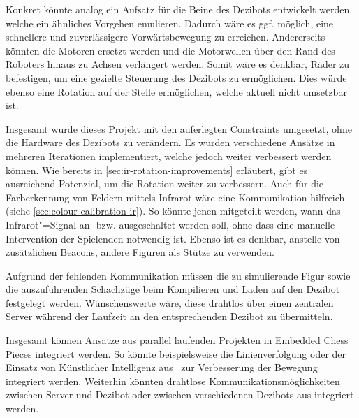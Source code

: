 
Konkret könnte analog ein Aufsatz für die Beine des Dezibots entwickelt werden, welche ein ähnliches Vorgehen emulieren. Dadurch wäre es ggf. möglich, eine schnellere und zuverlässigere Vorwärtsbewegung zu erreichen. Andererseits könnten die Motoren ersetzt werden und die Motorwellen über den Rand des Roboters hinaus zu Achsen verlängert werden. Somit wäre es denkbar, Räder zu befestigen, um eine gezielte Steuerung des Dezibots zu ermöglichen. Dies würde ebenso eine Rotation auf der Stelle ermöglichen, welche aktuell nicht umsetzbar ist.


Insgesamt wurde dieses Projekt mit den auferlegten Constraints umgesetzt, ohne die Hardware des Dezibots zu verändern. Es wurden verschiedene Ansätze in mehreren Iterationen implementiert, welche jedoch weiter verbessert werden können. Wie bereits in \autoref{sec:ir-rotation-improvements} erläutert, gibt es ausreichend Potenzial, um die Rotation weiter zu verbessern. Auch für die Farberkennung von Feldern mittels Infrarot wäre eine Kommunikation hilfreich (siehe \autoref{sec:colour-calibration-ir}). So könnte jenen mitgeteilt werden, wann das Infrarot"=Signal an- bzw. ausgeschaltet werden soll, ohne dass eine manuelle Intervention der Spielenden notwendig ist. Ebenso ist es denkbar, anstelle von zusätzlichen Beacons, andere Figuren als Stütze zu verwenden.


Aufgrund der fehlenden Kommunikation müssen die zu simulierende Figur sowie die auszuführenden Schachzüge beim Kompilieren und Laden auf den Dezibot festgelegt werden. Wünschenswerte wäre, diese drahtlos über einen zentralen Server während der Laufzeit an den entsprechenden Dezibot zu übermitteln.


Insgesamt können Ansätze aus parallel laufenden Projekten in Embedded Chess Pieces integriert werden. So könnte beispielsweise die Linienverfolgung oder der Einsatz von Künstlicher Intelligenz aus~\cite{antonovSnskorpion2DezibotLabyrinthSolver2025} zur Verbesserung der Bewegung integriert werden. Weiterhin könnten drahtlose Kommunikationsmöglichkeiten zwischen Server und Dezibot oder zwischen verschiedenen Dezibots aus \mbox{\cite{bruderMoseschmiedelDezibot2025,dietrichTimDietrichDezibotlogging2025,richterCurvesHubDezibotDebugInterface2025}} integriert werden.
